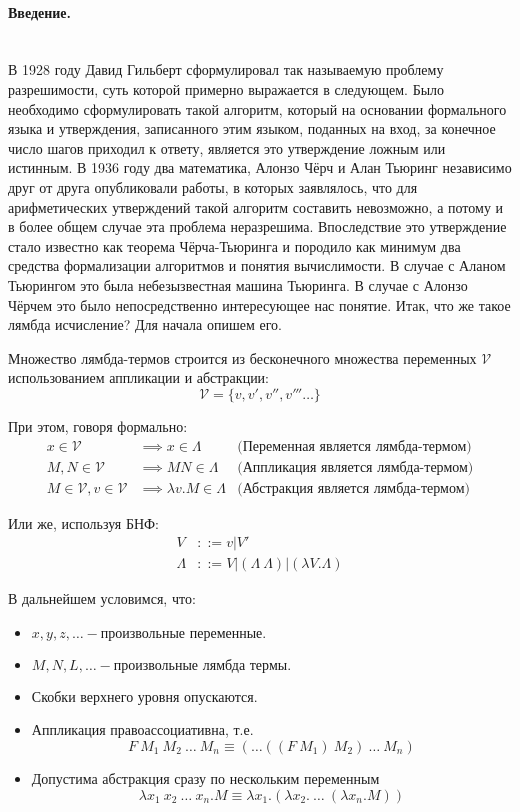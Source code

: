 \documentclass[lambda.tex]{subfiles}
\begin{document}
\paragraph{Введение.} ~\\

В 1928 году Давид Гильберт сформулировал так называемую проблему разрешимости, суть которой примерно выражается в следующем. Было необходимо сформулировать такой алгоритм, который на основании формального языка и утверждения, записанного этим языком, поданных на вход, за конечное число шагов приходил к ответу, является это утверждение ложным или истинным. В 1936 году два математика, Алонзо Чёрч и Алан Тьюринг независимо друг от друга опубликовали работы, в которых заявлялось, что для арифметических утверждений такой алгоритм составить невозможно, а потому и в более общем случае эта проблема неразрешима. Впоследствие это утверждение стало известно как теорема Чёрча-Тьюринга и породило как минимум два средства формализации алгоритмов и понятия вычислимости. В случае с Аланом Тьюрингом это была небезызвестная машина Тьюринга. В случае с Алонзо Чёрчем это было непосредственно интересующее нас понятие. Итак, что же такое лямбда исчисление? Для начала опишем его.

Множество лямбда-термов строится из бесконечного множества переменных $\mathcal{V}$ использованием аппликации и абстракции:
\[\mathcal{V} = \{ v, v', v'', v''' \dots \}\]

При этом, говоря формально:
\begin{align*}
x \in \mathcal{V} & \implies x \in \Lambda & \text{(Переменная является лямбда-термом)}\\
M, N \in \mathcal{V} & \implies M N \in \Lambda & \text{(Аппликация является лямбда-термом)}\\
M \in \mathcal{V}, v \in \mathcal{V} & \implies \lambda v.M \in \Lambda & \text{(Абстракция является лямбда-термом)}
\end{align*}

Или же, используя БНФ:
\begin{align*}
V &::= v|V'\\
\Lambda &::= V | (\Lambda\ \Lambda) | ( \lambda V . \Lambda )
\end{align*}

В дальнейшем условимся, что:
\begin{itemize}
\item\(x,y,z,\dots - \text{произвольные переменные.}\)
\item\(M,N,L,\dots - \text{произвольные лямбда термы.}\)
\item Скобки верхнего уровня опускаются.
\item Аппликация правоассоциативна, т.е.\\
\[F\ M_1 \ M_2 \ \dots\ M_n \equiv (\dots((F\ M_1)\ M_2)\ \dots\ M_n)\]
\item Допустима абстракция сразу по нескольким переменным
\[\lambda x_1 \ x_2 \ \dots\ x_n .M \equiv \lambda x_1 .(\lambda x_2 .\ \dots\ (\lambda x_n .M))\]
\end{itemize}
\end{document}
